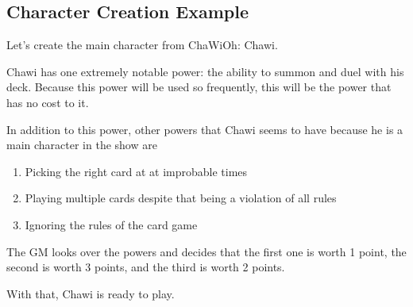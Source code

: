 \begin{flushleft}
\section*{Character Creation Example}

Let's create the main character from ChaWiOh: Chawi.

Chawi has one extremely notable power: the ability to summon and duel with
his deck. Because this power will be used so frequently, this will be the
power that has no cost to it.

In addition to this power, other powers that Chawi seems to have because he is
a main character in the show are

\begin{enumerate}

    \item{Picking the right card at at improbable times}
    \item{Playing multiple cards despite that being a violation of all rules}
    \item{Ignoring the rules of the card game}

\end{enumerate}

The GM looks over the powers and decides that the first one is worth 1 point,
the second is worth 3 points, and the third is worth 2 points.

With that, Chawi is ready to play.


\end{flushleft}
